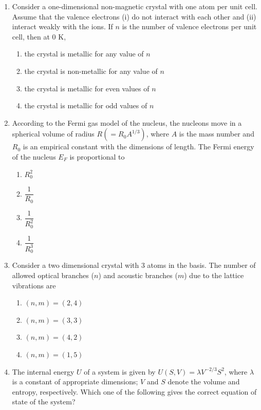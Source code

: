\documentclass[journal,12pt,onecolumn]{IEEEtran}
\theoremstyle{remark}
\begin{document}
\begin{enumerate}
   
     \item Consider a one-dimensional non-magnetic crystal with one atom per unit cell. Assume that the valence electrons (i) do not interact with each other and (ii) interact weakly with the ions. If $n$ is the number of valence electrons per unit cell, then at $0$ K,
    
    \begin{enumerate}
        \item the crystal is metallic for any value of $n$
        \item the crystal is non-metallic for any value of $n$
        \item the crystal is metallic for even values of $n$
        \item the crystal is metallic for odd values of $n$
    \end{enumerate}
   

    \item According to the Fermi gas model of the nucleus, the nucleons move in a spherical volume of radius $R (= R_0 A^{1/3})$, where $A$ is the mass number and $R_0$ is an empirical constant with the dimensions of length. The Fermi energy of the nucleus $E_F$ is proportional to
    
    \begin{enumerate}
        \item $R_0^2$
        \item $\dfrac{1}{R_0}$
        \item $\dfrac{1}{R_0^2}$
        \item $\dfrac{1}{R_0^3}$
    \end{enumerate}
    
    \item Consider a two dimensional crystal with $3$ atoms in the basis. The number of allowed optical branches ($n$) and acoustic branches ($m$) due to the lattice vibrations are
   
    \begin{enumerate}
        \item $(n, m) = (2, 4)$
        \item $(n, m) = (3, 3)$
        \item $(n, m) = (4, 2)$
        \item $(n, m) = (1, 5)$
    \end{enumerate}
    

    \item The internal energy $U$ of a system is given by $U(S, V) = \lambda V^{-2/3} S^2$, where $\lambda$ is a constant of appropriate dimensions; $V$ and $S$ denote the volume and entropy, respectively. Which one of the following gives the correct equation of state of the system?
    

\end{enumerate}
\end{document}
